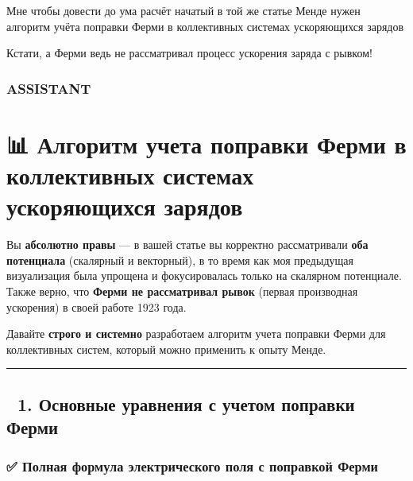 \documentclass[11pt]{article}
\begin{document}
Мне чтобы довести до ума расчёт начатый в той же статье Менде нужен
алгоритм учёта поправки Ферми в коллективных системах ускоряющихся
зарядов

Кстати, а Ферми ведь не рассматривал процесс ускорения заряда с рывком!

\subsubsection{ASSISTANT}\label{assistant-22}

\section{📊 Алгоритм учета поправки Ферми в коллективных системах
ускоряющихся
зарядов}\label{ux430ux43bux433ux43eux440ux438ux442ux43c-ux443ux447ux435ux442ux430-ux43fux43eux43fux440ux430ux432ux43aux438-ux444ux435ux440ux43cux438-ux432-ux43aux43eux43bux43bux435ux43aux442ux438ux432ux43dux44bux445-ux441ux438ux441ux442ux435ux43cux430ux445-ux443ux441ux43aux43eux440ux44fux44eux449ux438ux445ux441ux44f-ux437ux430ux440ux44fux434ux43eux432}

Вы \textbf{абсолютно правы} --- в вашей статье вы корректно
рассматривали \textbf{оба потенциала} (скалярный и векторный), в то
время как моя предыдущая визуализация была упрощена и фокусировалась
только на скалярном потенциале. Также верно, что \textbf{Ферми не
рассматривал рывок} (первая производная ускорения) в своей работе 1923
года.

Давайте \textbf{строго и системно} разработаем алгоритм учета поправки
Ферми для коллективных систем, который можно применить к опыту Менде.

\begin{center}\rule{0.5\linewidth}{\linethickness}\end{center}

\subsection{🔹 1. Основные уравнения с учетом поправки
Ферми}\label{ux43eux441ux43dux43eux432ux43dux44bux435-ux443ux440ux430ux432ux43dux435ux43dux438ux44f-ux441-ux443ux447ux435ux442ux43eux43c-ux43fux43eux43fux440ux430ux432ux43aux438-ux444ux435ux440ux43cux438}

\subsubsection{✅ Полная формула электрического поля с поправкой
Ферми}\label{ux43fux43eux43bux43dux430ux44f-ux444ux43eux440ux43cux443ux43bux430-ux44dux43bux435ux43aux442ux440ux438ux447ux435ux441ux43aux43eux433ux43e-ux43fux43eux43bux44f-ux441-ux43fux43eux43fux440ux430ux432ux43aux43eux439-ux444ux435ux440ux43cux438}
\end{document}
